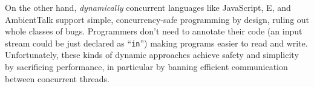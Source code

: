 

%
%
%
%

On the other hand,
\textit{dynamically} concurrent languages like
JavaScript\cite{JSVAts},
E\cite{MillerPhD}, and
AmbientTalk\cite{AmbientTalk} support simple,
concurrency-safe programming by design, ruling out whole classes of
bugs.
Programmers don't need to annotate their code
(an input stream could be just declared as ``\verb+in+'')
making programs easier to read and write.
Unfortunately, these kinds of dynamic approaches achieve safety and simplicity
by sacrificing performance, in particular by banning efficient
communication between concurrent threads.

